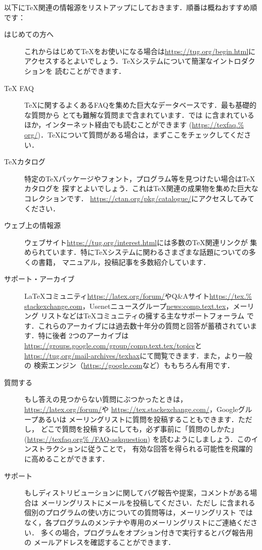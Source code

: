 \documentclass[uplatex,dvipdfmx,tombow]{jsarticle}
\begin{document}
以下に\TeX 関連の情報源をリストアップにしておきます．順番は概ねおすすめ順です：
%
\begin{description}
\item[はじめての方へ]
これからはじめて\TeX をお使いになる場合は\url{https://tug.org/begin.html}に
アクセスするとよいでしょう．\TeX システムについて簡潔なイントロダクションを
読むことができます．

\item[{\TeX} FAQ]
\TeX に関するよくあるFAQを集めた巨大なデータベースです．最も基礎的な質問から
とても難解な質問まで含まれています．\TL では%
に含まれているほか，インターネット経由でも読むことができます (\url{https://texfaq.%
org/})．\TeX について質問がある場合は，まずここをチェックしてください．

\item[\TeX カタログ]
特定の\TeX パッケージやフォント，プログラム等を見つけたい場合は\TeX カタログを
探すとよいでしょう．これは\TeX 関連の成果物を集めた巨大なコレクションです．
\url{https://ctan.org/pkg/catalogue/}にアクセスしてみてください．

\item[ウェブ上の情報源]
ウェブサイト\url{https://tug.org/interest.html}には多数の\TeX 関連リンクが
集められています．特に\TeX システムに関わるさまざまな話題についての多くの書籍，
マニュアル，投稿記事を多数紹介しています．

\item[サポート・アーカイブ]
\LaTeX コミュニティ\url{https://latex.org/forum/}やQ\&Aサイト\url{https://tex.%
stackexchange.com}，Usenetニュースグループ\url{news:comp.text.tex}，メーリング
リストなどは\TeX コミュニティの擁する主なサポートフォーラム
です．これらのアーカイブには過去数十年分の質問と回答が蓄積されています．特に後者
2つのアーカイブは\url{https://groups.google.com/group/comp.text.tex/topics}と
\url{https://tug.org/mail-archives/texhax}にて閲覧できます．また，より一般の
検索エンジン（\url{https://google.com}など）ももちろん有用です．

\item[質問する]
もし答えの見つからない質問にぶつかったときは，\url{https://latex.org/forum/}や
\url{https://tex.stackexchange.com/}，Googleグループあるいは
メーリングリストに質問を投稿することもできます．ただし，
どこで質問を投稿するにしても，必ず事前に「質問のしかた」(\url{https://texfaq.org%
/FAQ-askquestion}) を読むようにしましょう．このインストラクションに従うことで，
有効な回答を得られる可能性を飛躍的に高めることができます．

\item[\TL サポート]
もし\TL ディストリビューションに関してバグ報告や提案，コメントがある場合は
\TL メーリングリストにメールを投稿してください．ただし
\TL に含まれる個別のプログラムの使い方についての質問等は，\TL メーリングリスト
ではなく，各プログラムのメンテナや専用のメーリングリストにご連絡ください．
多くの場合，プログラムをオプション付きで実行するとバグ報告用の
メールアドレスを確認することができます．
\end{description}
\end{document}
